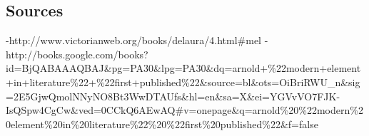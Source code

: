 \subsection{Sources}\label{sources}

-http://www.victorianweb.org/books/delaura/4.html\#mel
-http://books.google.com/books?id=BjQABAAAQBAJ\&pg=PA30\&lpg=PA30\&dq=arnold+\%22modern+element+in+literature\%22+\%22first+published\%22\&source=bl\&ots=OiBriRWU\_n\&sig=2E5GjwQmolNNyNO8Bt3WwDTAUfs\&hl=en\&sa=X\&ei=YGVvVO7FJK-IsQSpw4CgCw\&ved=0CCkQ6AEwAQ\#v=onepage\&q=arnold\%20\%22modern\%20element\%20in\%20literature\%22\%20\%22first\%20published\%22\&f=false

